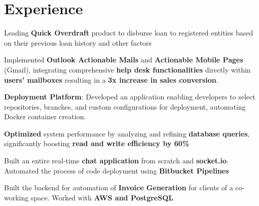 \documentclass{deedy-resume-openfont}
\begin{document}
\hfill
\begin{minipage}[t]{0.66\textwidth} 


\section{Experience}

\begin{tightemize}
\item Leading \textbf{Quick Overdraft} product to disburse loan to registered entities based on their previous loan history and other factors
\end{tightemize}
\sectionsep

\vspace{\topsep} %
\begin{tightemize}
\item Implemented \textbf{Outlook Actionable Mails} and \textbf{Actionable Mobile Pages} (Gmail), integrating comprehensive \textbf{help desk functionalities} directly within \textbf{users' mailboxes} resulting in a \textbf{3x increase in sales conversion}.
\item \textbf{Deployment Platform}: Developed an application enabling developers to select repositories, branches, and custom configurations for deployment, automating Docker container creation.
\item  \textbf{Optimized} system performance by analyzing and refining \textbf{database queries}, significantly boosting \textbf{read and write efficiency by 60\%}
\end{tightemize}
\sectionsep

\begin{tightemize}
\item Built an entire real-time \textbf{chat application} from scratch and \textbf{socket.io}. Automated the process of code deployment using \textbf{Bitbucket Pipelines}
\item Built the backend for automation of \textbf{Invoice Generation} for clients of a co-working space. Worked with \textbf{AWS and PostgreSQL}
\end{tightemize}
\sectionsep


\end{minipage}
\end{document}
